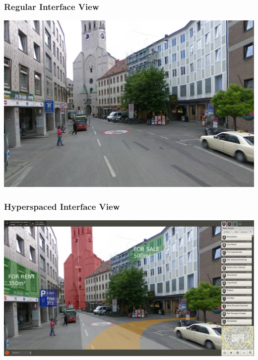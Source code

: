 \documentclass{beamer}
\begin{document}
{
\begin{frame}[plain]
\frametitle{\vspace{-2.40ex}Regular Interface View}
 \begin{center}
 \vspace{2.40ex}
  \includegraphics[scale=0.23]{images/streetview}
 \end{center}
\end{frame}
}

{
\begin{frame}[plain]
\frametitle{\vspace{-2.40ex}Hyperspaced Interface View}
 \vspace{2.40ex}
  \includegraphics[scale=0.214]{images/dspace-fiction}
\end{frame}
}

\addtocounter{framenumber}{-1}

%
\end{document}
